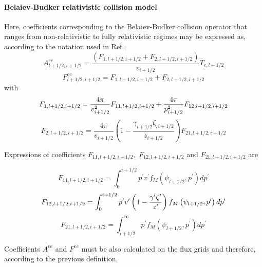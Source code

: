 \paragraph{Belaiev-Budker relativistic collision model}

Here, coefficients corresponding to the Belaiev-Budker collision operator
that ranges from non-relativistic to fully relativistic regimes may be
expressed as, according to the notation used in Ref.\cite{shk97},
\begin{equation}
A_{l+1/2,i+1/2}^{ee}=\frac{\left( F_{1,l+1/2,i+1/2}+F_{2,l+1/2,i+1/2}\right)
}{v_{i+1/2}}\overline{T}_{e,l+1/2}
\end{equation}
\begin{equation}
F_{l+1/2,i+1/2}^{ee}=F_{1,l+1/2,i+1/2}+F_{2,l+1/2,i+1/2}
\end{equation}
with
\begin{equation}
F_{1,l+1/2,i+1/2}=\frac{4\pi }{v_{i+1/2}^{2}}F_{11,l+1/2,i+1/2}+\frac{4\pi }{%
p_{i+1/2}^{2}}F_{12,l+1/2,i+1/2}
\end{equation}
\begin{equation}
F_{2,l+1/2,i+1/2}=\frac{4\pi }{v_{i+1/2}}\left( 1-\frac{\gamma _{i+1/2}\zeta
_{,i+1/2}}{z_{i+1/2}}\right) F_{21,l+1/2,i+1/2}
\end{equation}

Expressions of coefficients $F_{11,l+1/2,i+1/2},$ $F_{12,l+1/2,i+1/2}$ and $%
F_{21,l+1/2,i+1/2}$ are

\begin{equation}
F_{11,l+1/2,i+1/2}=\int_{0}^{i+1/2}p^{\prime }v^{\prime }f_{M}\left( \psi
_{l+1/2},p^{\prime }\right) dp^{\prime }
\end{equation}
\begin{equation}
F_{12,l+1/2,i+1/2}=\int_{0}^{i+1/2}p^{\prime }v^{\prime }\left( 1-\frac{%
\gamma ^{\prime }\zeta ^{\prime }}{z^{\prime }}\right) f_{M}\left( \psi
_{l+1/2},p^{\prime }\right) dp^{\prime }
\end{equation}
\begin{equation}
F_{21,l+1/2,i+1/2}=\int_{i+1/2}^{\infty }p^{\prime }f_{M}\left( \psi
_{l+1/2},p^{\prime }\right) dp^{\prime }
\end{equation}

Coefficients $A^{ee}$ and $F^{ee}$ must be also calculated on the flux grids
and therefore, according to the previous definition,

